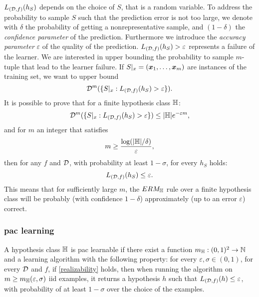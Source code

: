 $L_{(\mathcal{D},f)}(h_S)$ depends on the choice of $S$, that is a
random variable. To address the probability to sample $S$ such that
the prediction error is not too large, we denote with $\delta$ the
probability of getting a nonrepresentative sample, and $(1-\delta)$
the \emph{confidence parameter} of the prediction. Furthermore we
introduce the \emph{accuracy parameter} $\varepsilon$ of the quality
of the prediction. $L_{(\mathcal{D},f)}(h_S)>\varepsilon$ represents
a failure of the learner.
We are interested in upper bounding the probability to sample
$m$-tuple that lead to the learner failure. If $S|_x=(\bm{x}_1,\dots,\bm{x}_m)$
are instances of the training set, we want to upper bound
\begin{equation*}
  \mathcal{D}^m(\{S|_x:L_{(\mathcal{D},f)}(h_S)>\varepsilon\}).
\end{equation*}
It is possible to prove that for a finite hypothesis class $\mathbb{H}$:
\begin{equation*}
  \mathcal{D}^m(\{S|_x:L_{(\mathcal{D},f)}(h_S)>\varepsilon\}) \leq
  |\mathbb{H}|e^{-\varepsilon m},
\end{equation*}
and for $m$ an integer that satisfies
\begin{equation*}
  m\geq\frac{\log(|\mathbb{H}|/\delta)}{\varepsilon},
\end{equation*}
then for any $f$ and $\mathcal{D}$, with probability at least $1-\sigma$,
for every $h_S$ holds:
\begin{equation*}
  L_{(\mathcal{D},f)}(h_S)\leq\varepsilon.
\end{equation*}
This means that for sufficiently large $m$, the $ERM_{\mathbb{H}}$ rule over
a finite hypothesis class will be probably (with confidence
$1-\delta$) approximately (up to an error $\varepsilon$) correct.

\subsubsection{\ac{pac} learning}
\begin{definition}\label{pacLearnability}
A hypothesis class $\mathbb{H}$ is \ac{pac} learnable if there exist a
function $m_{\mathbb{H}}:(0,1)^2\rightarrow\mathbb{N}$ and a learning algorithm
with the following property: for every $\varepsilon,\sigma\in(0,1)$,
for every $\mathcal{D}$ and $f$, if \cref{realizability} holds, then when
running the algorithm on $m\geq m_{\mathbb{H}}(\varepsilon,\sigma)$ \ac{iid}
examples, it returns a hypothesis $h$ such that
$L_{(\mathcal{D},f)}(h)\leq\varepsilon$, with probability of at least
$1-\sigma$ over the choice of the examples.
\end{definition}

